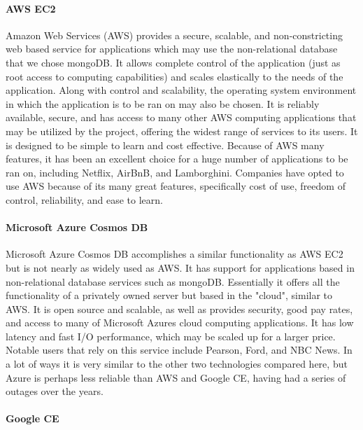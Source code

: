 	\paragraph{AWS EC2}
	
		Amazon Web Services (AWS) provides a secure, scalable, and non-constricting web based service for applications which may use the non-relational database that we chose mongoDB. It allows complete control of the application (just as root access 
		to computing capabilities) and scales elastically to the needs of the application. Along with control and scalability, the operating system environment in which the application
		is to be ran on may also be chosen. It is reliably available, secure, and has access to many other AWS computing applications that may be utilized by the project, offering the widest
		range of services to its users. It is designed to be simple to learn and cost effective. Because of AWS many features, it has been an excellent choice for a huge number of applications to be ran on, including
		Netflix, AirBnB, and Lamborghini. Companies have opted to use AWS because of its many great features, specifically cost of use, freedom of control, reliability, and ease to learn. 
	
	\paragraph{Microsoft Azure Cosmos DB}
	
		Microsoft Azure Cosmos DB accomplishes a similar functionality as AWS EC2 but is not nearly as widely used as AWS. It has support for applications based in
		non-relational database services such as mongoDB. Essentially it offers all the functionality of a privately owned server but based in the "cloud", similar to AWS.
		It is open source and scalable, as well as provides security, good pay rates, and access to many of Microsoft Azures cloud computing applications. It has low latency and fast
		I/O performance, which may be scaled up for a larger price. Notable users that rely on this service include Pearson, Ford, and NBC News.  
		In a lot of ways it is very similar to the other two technologies compared here, but Azure is perhaps less reliable than AWS and Google CE, having had a series of outages over the years.
	
	\paragraph{Google CE}
	
